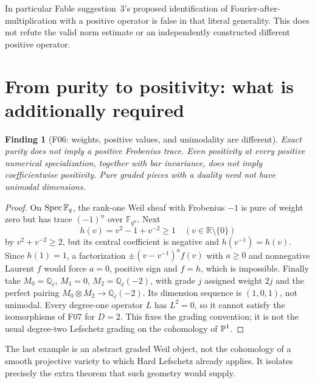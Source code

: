 \documentclass[11pt,a4paper]{article}
\newcommand{\Q}{\mathbb Q}\newcommand{\Z}{\mathbb Z}\newcommand{\C}{\mathbb C}\newcommand{\N}{\mathbb N}\newcommand{\F}{\mathbb F}
\newcommand{\fid}[1]{\textsf{#1}}\newcommand{\gate}[1]{\textsf{#1}}
\theoremstyle{named}\newtheorem{finding}{Finding}[section]
\theoremstyle{definition}\newtheorem{definition}[finding]{Definition}
\theoremstyle{remark}\newtheorem{remark}[finding]{Remark}
\begin{document}
In particular Fable suggestion~3's proposed identification of Fourier-after-multiplication with a positive operator is false in that literal generality. This does not refute the valid norm estimate or an independently constructed different positive operator.

\section{From purity to positivity: what is additionally required}\label{sec:positivity}
\begin{finding}[\fid{F06}: weights, positive values, and unimodality are different]\label{f:phase}
Exact purity does not imply a positive Frobenius trace. Even positivity at every positive numerical specialization, together with bar invariance, does not imply coefficientwise positivity. Pure graded pieces with a duality need not have unimodal dimensions.
\end{finding}
\begin{proof}
On $\Spec\F_q$, the rank-one Weil sheaf with Frobenius $-1$ is pure of weight zero but has trace $(-1)^n$ over $\F_{q^n}$. Next
\[
 h(v)=v^2-1+v^{-2}\ge1\quad(v\in\mathbb R\setminus\{0\})
\]
by $v^2+v^{-2}\ge2$, but its central coefficient is negative and $h(v^{-1})=h(v)$. Since $h(1)=1$, a factorization $\pm(v-v^{-1})^a f(v)$ with $a\ge0$ and nonnegative Laurent $f$ would force $a=0$, positive sign and $f=h$, which is impossible. Finally take $M_0=\Q_\ell$, $M_1=0$, $M_2=\Q_\ell(-2)$, with grade $j$ assigned weight $2j$ and the perfect pairing $M_0\otimes M_2\to\Q_\ell(-2)$. Its dimension sequence is $(1,0,1)$, not unimodal. Every degree-one operator $L$ has $L^2=0$, so it cannot satisfy the isomorphisms of \fid{F07} for $D=2$. This fixes the grading convention; it is not the usual degree-two Lefschetz grading on the cohomology of $\mathbb P^1$.
\end{proof}
The last example is an abstract graded Weil object, not the cohomology of a smooth projective variety to which Hard Lefschetz already applies. It isolates precisely the extra theorem that such geometry would supply.
\end{document}
